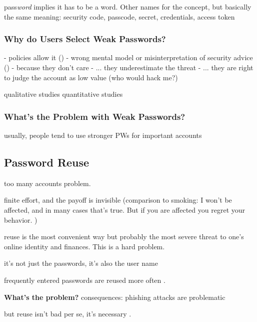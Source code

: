 	pass\textit{word} implies it has to be a word. Other names for the concept, but basically the same meaning: security code, passcode, secret, credentials, access token
	

		\subsubsection{Why do Users Select Weak Passwords?}
	
	- policies allow it (\cite{Seitz2017PoliciesReuse})
	- wrong mental model or misinterpretation of security advice (\cite{Ur2015PWCreationLab, Ur2016PerceptionsPassword, Seitz2017PASDJO})
	- because they don't care
	- ... they underestimate the threat
	- ... they are right to judge the account as low value (who would hack me?) \cite{LastPass2016PersonalitiesGetUsHacked}
	
	
	qualitative studies \cite{Ur2015PWCreationLab, Stobert2014PasswordLifeCycle} 
	quantitative studies \cite{Ur2016PerceptionsPassword, Seitz2017PASDJO}
	
	\subsubsection{What's the Problem with Weak Passwords?}
	usually, people tend to use stronger PWs for important accounts

	


	\subsection{Password Reuse}
	too many accounts problem. 
	
	finite effort, and the payoff is invisible (comparison to smoking: I won't be affected, and in many cases that's true. But if you are affected you regret your behavior. )
	
	reuse is the most convenient way but probably the most severe threat to one's online identity and finances. This is a hard problem. 
	
	it's not just the passwords, it's also the user name 
	
	frequently entered passwords are reused more often \cite{Wash2016UnderstandingPasswordChoices}.
	
	\textbf{What's the problem?}
	consequences: phishing attacks are problematic
	
	but reuse isn't bad per se, it's necessary \cite{Florencio2014PasswordPortfoliosFiniteUser, ZhangKennedy2016RevisitingPasswordRules}. 
	

